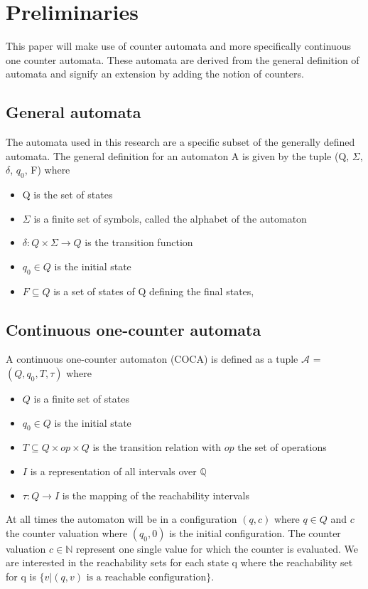 \documentclass[12pt]{thesis}
\begin{document}
\chapter{Preliminaries}
This paper will make use of counter automata and more specifically continuous one counter automata. These automata are derived from the general definition of automata and signify an extension by adding the notion of counters.

\section{General automata}
The automata used in this research are a specific subset of the generally defined automata. The general definition for an automaton A is given by the tuple (Q, $\Sigma$, $\delta$, $q_0$, F) where
\begin{itemize}
	\item Q is the set of states
	\item $\Sigma$ is a finite set of symbols, called the alphabet of the automaton
	\item $\delta: Q \times \Sigma \rightarrow Q$ is the transition function
	\item $q_0 \in Q$ is the initial state
	\item $F \subseteq Q$ is a set of states of Q defining the final states, 
\end{itemize}

\section{Continuous one-counter automata}
A continuous one-counter automaton (COCA) is defined as a tuple $\mathcal{A}$ = $(Q, q_0, T, \tau)$ where
\begin{itemize}
	\item $Q$ is a finite set of states
	\item $q_0 \in Q$ is the initial state
	\item $T \subseteq Q \times op \times Q$ is the transition relation with $op$ the set of operations
	\item $I$ is a representation of all intervals over $\mathbb{Q}$
	\item $\tau: Q \rightarrow I$ is the mapping of the reachability intervals
\end{itemize}

At all times the automaton will be in a configuration $(q, c)$ where $q \in Q$ and $c$ the counter valuation where $(q_0, 0)$ is the initial configuration. The counter valuation $c \in \mathbb{N}$ represent one single value for which the counter is evaluated. We are interested in the reachability sets for each state q where the reachability set for q is $\{v | (q, v) \text{ is a reachable configuration}\}$.
\end{document}
